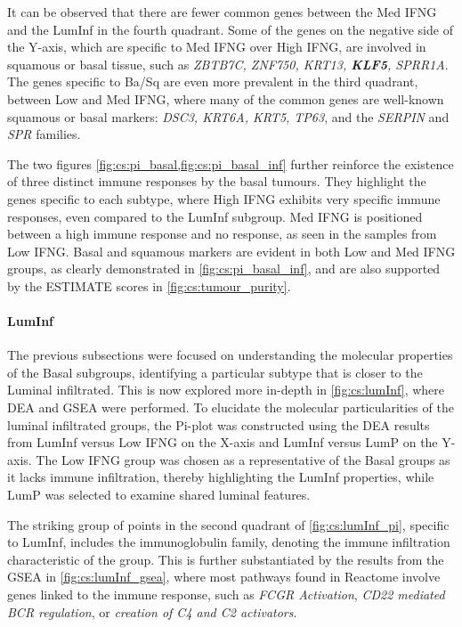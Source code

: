 It can be observed that there are fewer common genes between the Med IFNG and the LumInf in the fourth quadrant. Some of the genes on the negative side of the Y-axis, which are specific to Med IFNG over High IFNG, are involved in squamous or basal tissue, such as \textit{ZBTB7C, ZNF750, KRT13, \textbf{KLF5}, SPRR1A}. The genes specific to Ba/Sq are even more prevalent in the third quadrant, between Low and Med IFNG, where many of the common genes are well-known squamous or basal markers: \textit{DSC3, KRT6A, KRT5, TP63}, and the \textit{SERPIN} and \textit{SPR} families.

The two figures \cref{fig:cs:pi_basal,fig:cs:pi_basal_inf} further reinforce the existence of three distinct immune responses by the basal tumours. They highlight the genes specific to each subtype, where High IFNG exhibits very specific immune responses, even compared to the LumInf subgroup. Med IFNG is positioned between a high immune response and no response, as seen in the samples from Low IFNG. Basal and squamous markers are evident in both Low and Med IFNG groups, as clearly demonstrated in \cref{fig:cs:pi_basal_inf}, and are also supported by the ESTIMATE scores in \cref{fig:cs:tumour_purity}.



\paragraph*{LumInf}

The previous subsections were focused on understanding the molecular properties of the Basal subgroups, identifying a particular subtype that is closer to the Luminal infiltrated. This is now explored more in-depth in \cref{fig:cs:lumInf}, where DEA and GSEA were performed. To elucidate the molecular particularities of the luminal infiltrated groups, the Pi-plot was constructed using the DEA results from LumInf versus Low IFNG on the X-axis and LumInf versus LumP on the Y-axis. The Low IFNG group was chosen as a representative of the Basal groups as it lacks immune infiltration, thereby highlighting the LumInf properties, while LumP was selected to examine shared luminal features.

The striking group of points in the second quadrant of \cref{fig:cs:lumInf_pi}, specific to LumInf, includes the immunoglobulin family, denoting the immune infiltration characteristic of the group. This is further substantiated by the results from the GSEA in \cref{fig:cs:lumInf_gsea}, where most pathways found in Reactome involve genes linked to the immune response, such as \textit{FCGR Activation}, \textit{CD22 mediated BCR regulation}, or \textit{creation of C4 and C2 activators}.


